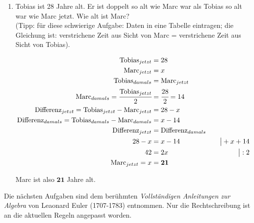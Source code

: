 \documentclass[a4paper,10pt]{article} %
\begin{document}
\begin{enumerate}
    \[
      \begin{aligned}
        A_1 &= x^2 \\
        A_2 &= A_1 - 10cm^2 = x^2 - 10cm^2 \\
        A_2 &= (x - 2cm) \cdot x = x^2 - 2cm \cdot x \\
        x^2 - 2cm \cdot x &= x^2 - 10cm^2 &\quad\big| - x^2 \\
        -2cm \cdot x &= -10cm^2 &\quad\big| : (-2cm) \\
        x &= \mathbf{5cm}
      \end{aligned}
    \]

    Die Seite des Quadrates ist also \(\mathbf{5cm}\) lang.

  \item Tobias ist 28 Jahre alt. Er ist doppelt so alt wie Marc war als Tobias so alt war wie Marc jetzt.
    Wie alt ist Marc? \\
    (Tipp: für diese schwierige Aufgabe: Daten in eine Tabelle eintragen;
    die Gleichung ist: verstrichene Zeit aus Sicht von Marc = verstrichene Zeit aus Sicht von Tobias).

    \[
      \begin{aligned}
        \textnormal{Tobias}_{jetzt} &= 28 \\
        \textnormal{Marc}_{jetzt} &= x \\
        \textnormal{Tobias}_{damals} &= \textnormal{Marc}_{jetzt} \\
        \textnormal{Marc}_{damals} = \cfrac{\textnormal{Tobias}_{jetzt}}{2} &= \cfrac{28}{2} = 14 \\
        \textnormal{Differenz}_{jetzt} = \textnormal{Tobias}_{jetzt} - \textnormal{Marc}_{jetzt} &= 28 - x \\
        \textnormal{Differenz}_{damals} = \textnormal{Tobias}_{damals} - \textnormal{Marc}_{damals} &= x - 14 \\
        \textnormal{Differenz}_{jetzt} &= \textnormal{Differenz}_{damals} \\
        28 - x &= x - 14 &\quad\big| + x + 14 \\
        42 &= 2x &\quad\big| : 2 \\
        \textnormal{Marc}_{jetzt} = x &= \mathbf{21}
      \end{aligned}
    \]

    Marc ist also \(\mathbf{21}\) Jahre alt.

\end{enumerate}

Die nächsten Aufgaben sind dem berühmten \textit{Vollständigen Anleitungen
zur Algebra} von Leaonard Euler (1707-1783) entnommen. Nur die Rechtschreibung
ist an die aktuellen Regeln angepasst worden.
\end{document}

